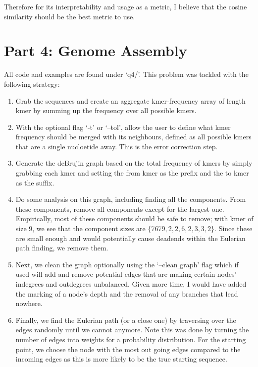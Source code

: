 \documentclass[10pt]{article}
\begin{document}
Therefore for its interpretability and usage as a metric, I believe that the cosine similarity should be the best metric to use.

\section*{Part 4: Genome Assembly}
All code and examples are found under `q4/'. This problem was tackled with the following strategy:
\begin{enumerate}
  \item Grab the sequences and create an aggregate kmer-frequency array of length kmer by summing up the frequency over all possible kmers.
  \item With the optional flag `-t' or `--tol', allow the user to define what kmer frequency should be merged with its neighbours, defined as all possible kmers that are a single nucloetide away. This is the error correction step.
  \item Generate the deBrujin graph based on the total frequency of kmers by simply grabbing each kmer and setting the from kmer as the prefix and the to kmer as the suffix.
  \item Do some analysis on this graph, including finding all the components. From these components, remove all components except for the largest one. Empirically, most of these components should be safe to remove; with kmer of size 9, we see that the component sizes are $\{7679, 2, 2, 6, 2, 3, 3, 2\}$. Since these are small enough and would potentially cause deadends within the Eulerian path finding, we remove them.
  \item Next, we clean the graph optionally using the `--clean$\_$graph' flag which if used will add and remove potential edges that are making certain nodes' indegrees and outdegrees unbalanced. Given more time, I would have added the marking of a node's depth and the removal of any branches that lead nowhere.
  \item Finally, we find the Eulerian path (or a close one) by traversing over the edges randomly until we cannot anymore. Note this was done by turning the number of edges into weights for a probability distribution. For the starting point, we choose the node with the most out going edges compared to the incoming edges as this is more likely to be the true starting sequence.
\end{enumerate}
\end{document}
